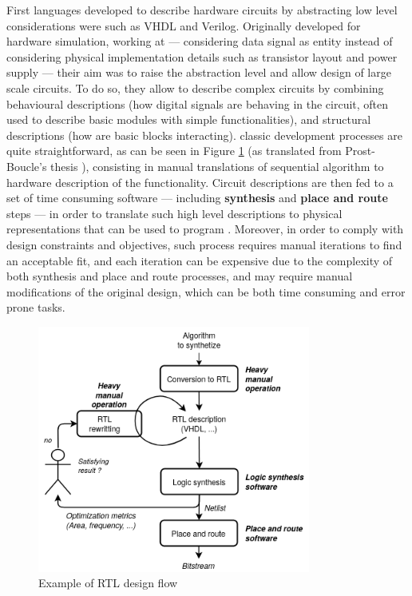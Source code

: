        First languages developed to describe hardware circuits by abstracting low level considerations were  such as VHDL and Verilog.
        Originally developed for hardware simulation, working at  --- \ie considering data signal as entity instead of considering physical implementation details such as transistor layout and power supply --- their aim was to raise the abstraction level and allow design of large scale circuits.
        To do so, they allow to describe complex circuits by combining behavioural descriptions (how digital signals are behaving in the circuit, often used to describe basic modules with simple functionalities), and structural descriptions (how are basic blocks interacting).
         classic development processes are quite straightforward, as can be seen in Figure \ref{ch.problem:sec.hardware:ssec.paradigms:fig.rtl} (as translated from Prost-Boucle's thesis \cite{prost-boucle_generation_2014}), consisting in manual translations of sequential algorithm to hardware description of the functionality.
        Circuit descriptions are then fed to a set of time consuming software --- including {\bf synthesis} and {\bf place and route} steps --- in order to translate such high level descriptions to physical representations that can be used to program .
        Moreover, in order to comply with design constraints and objectives, such process requires manual iterations to find an acceptable fit, and each iteration can be expensive due to the complexity of both synthesis and place and route processes, and may require manual modifications of the original design, which can be both time consuming and error prone tasks.
        
        \begin{figure}[h!]
            \centering
            \includegraphics[width=0.8\textwidth]{Figures/HDL-flow.png}
            \caption{Example of RTL design flow}
            \label{ch.problem:sec.hardware:ssec.paradigms:fig.rtl}
        \end{figure}

